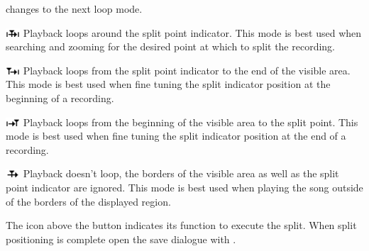 \begin{description}
      changes to the next loop mode.
      \begin{description}
        \item
        \includegraphics[width=0.53cm]{plugins/images/icon-splitedit-loop-1}
          Playback loops around the split point indicator. This mode is best
          used when searching and zooming for the desired point at which to split
          the recording.
        \item
        \includegraphics[width=0.53cm]{plugins/images/icon-splitedit-loop-2}
          Playback loops from the split point indicator to the end of the
          visible area. This mode is best used when fine tuning the split
          indicator position at the beginning of a recording.
        \item
        \includegraphics[width=0.53cm]{plugins/images/icon-splitedit-loop-3}
          Playback loops from the beginning of the
          visible area to the split point. This mode is best used when fine
          tuning the split indicator position at the end of a recording.
        \item
        \includegraphics[width=0.53cm]{plugins/images/icon-splitedit-loop-4}
          Playback doesn't loop, the borders of the visible
          area as well as the split point indicator are ignored. This mode is
          best used when playing the song outside of the borders of the displayed
          region.
      \end{description}
    \item[Perform the split (8)]
          The icon above the
          button indicates its function to execute the split. When split
          positioning is complete open the save dialogue with
          .
  \end{description}

